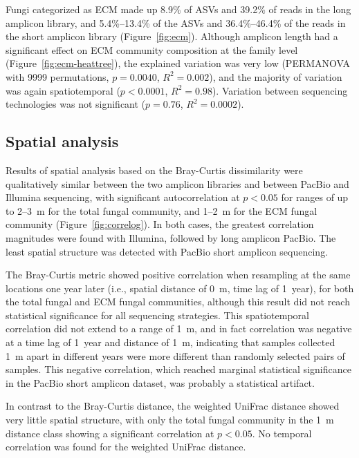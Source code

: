 \documentclass[
  12pt,
]{article}
\begin{document}
Fungi categorized as ECM made up 8.9\% of ASVs and 39.2\% of reads in the long amplicon library, and 5.4\%--13.4\% of the ASVs and 36.4\%--46.4\% of the reads in the short amplicon library (Figure~\ref{fig:ecm}).
Although amplicon length had a significant effect on ECM community composition at the family level (Figure~\ref{fig:ecm-heattree}), the explained variation was very low (PERMANOVA with 9999 permutations, \(p=0.0040\), \(R^2=0.002\)), and the majority of variation was again spatiotemporal (\(p<0.0001\), \(R^2=0.98\)).
Variation between sequencing technologies was not significant (\(p=0.76\), \(R^2=0.0002\)).

\hypertarget{spatial-analysis}{%
\subsection{Spatial analysis}\label{spatial-analysis}}

Results of spatial analysis based on the Bray-Curtis dissimilarity were qualitatively similar between the two amplicon libraries and between PacBio and Illumina sequencing, with significant autocorrelation at \(p < 0.05\) for ranges of up to 2--3~m for the total fungal community, and 1--2~m for the ECM fungal community (Figure~\ref{fig:correlog}).
In both cases, the greatest correlation magnitudes were found with Illumina, followed by long amplicon PacBio.
The least spatial structure was detected with PacBio short amplicon sequencing.

The Bray-Curtis metric showed positive correlation when resampling at the same locations one year later (i.e., spatial distance of 0~m, time lag of 1~year), for both the total fungal and ECM fungal communities, although this result did not reach statistical significance for all sequencing strategies.
This spatiotemporal correlation did not extend to a range of 1~m, and in fact correlation was negative at a time lag of 1~year and distance of 1~m, indicating that samples collected 1~m apart in different years were more different than randomly selected pairs of samples.
This negative correlation, which reached marginal statistical significance in the PacBio short amplicon dataset, was probably a statistical artifact.

In contrast to the Bray-Curtis distance, the weighted UniFrac distance showed very little spatial structure, with only the total fungal community in the 1~m
distance class showing a significant correlation at \(p < 0.05\).
No temporal correlation was found for the weighted UniFrac distance.
\end{document}
